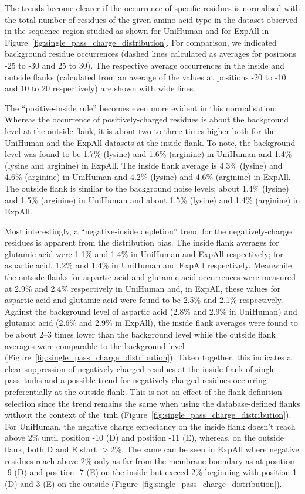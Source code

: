 The trends become clearer if the occurrence of specific residues is normalised with the total number of residues of the given amino acid type in the dataset observed in the sequence region studied as shown for UniHuman and for ExpAll in Figure~\ref{fig:single_pass_charge_distribution}.
For comparison, we indicated background residue occurrences (dashed lines calculated as averages for positions -25 to -30 and 25 to 30).
The respective average occurrences in the inside and outside flanks (calculated from an average of the values at positions -20 to -10 and 10 to 20 respectively) are shown with wide lines.

The ``positive-inside rule'' becomes even more evident in this normalisation: Whereas the occurrence of positively\--charged residues is about the background level at the outside flank, it is about two to three times higher both for the UniHuman and the ExpAll datasets at the inside flank.
To note, the background level was found to be 1.7\% (lysine) and 1.6\% (arginine) in UniHuman and 1.4\% (lysine and arginine) in ExpAll.
The inside flank average is 4.3\% (lysine) and 4.6\% (arginine) in UniHuman and 4.2\% (lysine) and 4.6\% (arginine) in ExpAll.
The outside flank is similar to the background noise levels: about 1.4\% (lysine) and 1.5\% (arginine) in UniHuman and about 1.5\% (lysine) and 1.4\% (arginine) in ExpAll.

Most interestingly, a ``negative‑inside depletion'' trend for the negatively\--charged residues is apparent from the distribution bias.
The inside flank averages for glutamic acid were 1.1\% and 1.4\% in UniHuman and ExpAll respectively; for aspartic acid, 1.2\% and 1.4\% in UniHuman and ExpAll respectively.
Meanwhile, the outside flanks for aspartic acid and glutamic acid occurrences were measured at 2.9\% and 2.4\% respectively in UniHuman and, in ExpAll, these values for aspartic acid and glutamic acid were found to be 2.5\% and 2.1\% respectively.
Against the background level of aspartic acid (2.8\% and 2.9\% in UniHuman) and glutamic acid (2.6\% and 2.9\% in ExpAll), the inside flank averages were found to be about 2--3 times lower than the background level while the outside flank averages were comparable to the background level (Figure~\ref{fig:single_pass_charge_distribution}).
Taken together, this indicates a clear suppression of negatively\--charged residues at the inside flank of single\--pass~\gls{tmh}s and a possible trend for negatively\--charged residues occurring preferentially at the outside flank.
This is not an effect of the flank definition selection since the trend remains the same when using the database-defined flanks without the context of the~\gls{tmh} (Figure~\ref{fig:single_pass_charge_distribution}).
For UniHuman, the negative charge expectancy on the inside flank doesn’t reach above 2\% until position -10 (D) and position -11 (E), whereas, on the outside flank, both D and E start $>$2\%.
The same can be seen in ExpAll where negative residues reach above 2\% only as far from the membrane boundary as at position -9 (D) and position -7 (E) on the inside but exceed 2\% beginning with position 1 (D) and 3 (E) on the outside (Figure~\ref{fig:single_pass_charge_distribution}).

